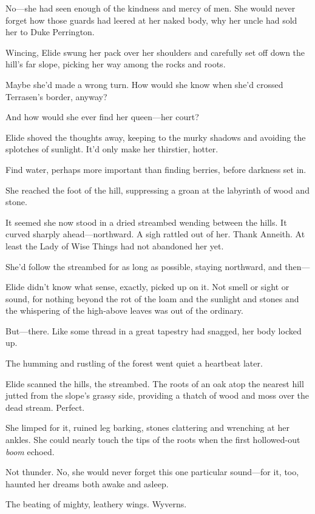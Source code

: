 No---she had seen enough of the kindness and mercy of men. She would never forget how those guards had leered at her naked body, why her uncle had sold her to Duke Perrington.

Wincing, Elide swung her pack over her shoulders and carefully set off down the hill's far slope, picking her way among the rocks and roots.

Maybe she'd made a wrong turn. How would she know when she'd crossed Terrasen's border, anyway?

And how would she ever find her queen---her court?

Elide shoved the thoughts away, keeping to the murky shadows and avoiding the splotches of sunlight. It'd only make her thirstier, hotter.

Find water, perhaps more important than finding berries, before darkness set in.

She reached the foot of the hill, suppressing a groan at the labyrinth of wood and stone.

It seemed she now stood in a dried streambed wending between the hills. It curved sharply ahead---northward. A sigh rattled out of her. Thank Anneith. At least the Lady of Wise Things had not abandoned her yet.

She'd follow the streambed for as long as possible, staying northward, and then---

Elide didn't know what sense, exactly, picked up on it. Not smell or sight or sound, for nothing beyond the rot of the loam and the sunlight and stones and the whispering of the high-above leaves was out of the ordinary.

But---there. Like some thread in a great tapestry had snagged, her body locked up.

The humming and rustling of the forest went quiet a heartbeat later.

Elide scanned the hills, the streambed. The roots of an oak atop the nearest hill jutted from the slope's grassy side, providing a thatch of wood and moss over the dead stream. Perfect.

She limped for it, ruined leg barking, stones clattering and wrenching at her ankles. She could nearly touch the tips of the roots when the first hollowed-out \emph{boom} echoed.

Not thunder. No, she would never forget this one particular sound---for it, too, haunted her dreams both awake and asleep.

The beating of mighty, leathery wings. Wyverns.

